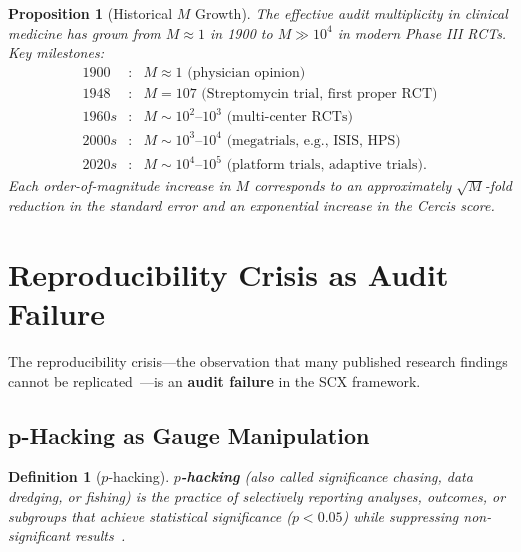 \documentclass[12pt,a4paper]{article}
\newtheorem{proposition}[theorem]{Proposition}
\newtheorem{definition}[theorem]{Definition}
\theoremstyle{remark}
\newcommand{\SCX}{\textsf{SCX}}
\newcommand{\Cercis}{\textsf{Cercis}}
\begin{document}
\begin{proposition}[Historical $M$ Growth]
\label{prop:m_growth}
The effective audit multiplicity in clinical medicine has grown from
$M \approx 1$ in 1900 to $M \gg 10^4$ in modern Phase III RCTs.
Key milestones:
\begin{equation}
  \begin{array}{lll}
    1900 &:& M \approx 1 \text{ (physician opinion)} \\[4pt]
    1948 &:& M = 107 \text{ (Streptomycin trial, first proper RCT)} \\[4pt]
    1960s &:& M \sim 10^2\text{--}10^3 \text{ (multi-center RCTs)} \\[4pt]
    2000s &:& M \sim 10^3\text{--}10^4 \text{ (megatrials, e.g., ISIS, HPS)} \\[4pt]
    2020s &:& M \sim 10^4\text{--}10^5 \text{ (platform trials, adaptive trials)}.
  \end{array}
\end{equation}
Each order-of-magnitude increase in $M$ corresponds to an approximately
$\sqrt{M}$-fold reduction in the standard error and an exponential
increase in the \Cercis{} score.
\end{proposition}


\section{Reproducibility Crisis as Audit Failure}
\label{sec:reproducibility}

The reproducibility crisis---the observation that many published research
findings cannot be replicated~\cite{ioannidis2005most, open_science2015}---is
an \textbf{audit failure} in the \SCX{} framework.

\subsection{p-Hacking as Gauge Manipulation}

\begin{definition}[$p$-hacking]
\label{def:phacking}
\textbf{$p$-hacking} (also called significance chasing, data dredging, or
fishing) is the practice of selectively reporting analyses, outcomes, or
subgroups that achieve statistical significance ($p < 0.05$) while
suppressing non-significant results~\cite{simonsohn2014pcurve}.
\end{definition}
\end{document}
